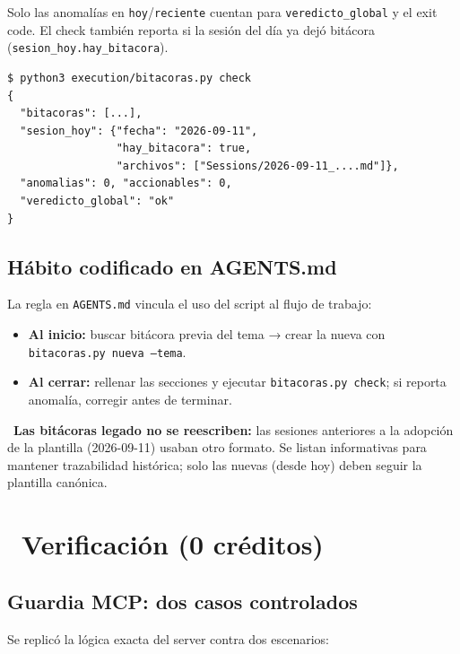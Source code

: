 \documentclass[11pt,a4paper]{article}
\newcommand{\iconotexto}[2]{\textcolor{cyanNeon}{\faIcon{#1}}~#2}
\begin{document}
Solo las anomalías en \texttt{hoy}/\texttt{reciente} cuentan para
\texttt{veredicto\_global} y el exit code. El check también reporta si la sesión
del día ya dejó bitácora (\texttt{sesion\_hoy.hay\_bitacora}).

\begin{lstlisting}[style=estiloPython]
$ python3 execution/bitacoras.py check
{
  "bitacoras": [...],
  "sesion_hoy": {"fecha": "2026-09-11",
                 "hay_bitacora": true,
                 "archivos": ["Sessions/2026-09-11_....md"]},
  "anomalias": 0, "accionables": 0,
  "veredicto_global": "ok"
}
\end{lstlisting}

\subsection{Hábito codificado en AGENTS.md}
La regla en \texttt{AGENTS.md} vincula el uso del script al flujo de trabajo:

\begin{itemize}[leftmargin=*]
  \item \textbf{Al inicio:} buscar bitácora previa del tema → crear la nueva con
        \texttt{bitacoras.py nueva --tema}.
  \item \textbf{Al cerrar:} rellenar las secciones y ejecutar
        \texttt{bitacoras.py check}; si reporta anomalía, corregir antes de terminar.
\end{itemize}

\begin{cajaRecuerda}
~\textbf{Las bitácoras legado no se reescriben:} las sesiones
anteriores a la adopción de la plantilla (2026-09-11) usaban otro formato. Se listan
informativas para mantener trazabilidad histórica; solo las nuevas (desde hoy) deben
seguir la plantilla canónica.
\end{cajaRecuerda}

\section{\iconotexto{flask}{Verificación (0 créditos)}}

\subsection{Guardia MCP: dos casos controlados}
Se replicó la lógica exacta del server contra dos escenarios:
\end{document}
